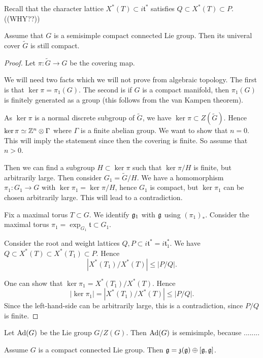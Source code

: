 \documentclass[11pt, english]{article}
\begin{document}
Recall that the character lattice $X^\ast (T) \subset i \mathfrak t^\ast$ satisfies $Q \subset X^\ast(T) \subset P$. ((WHY??))

\begin{prop}
 Assume that $G$ is a semisimple compact connected Lie group. Then its univeral cover $\widetilde G$ is still compact.
\end{prop}
\begin{proof}
Let $\pi: \widetilde G \to G$ be the covering map.

We will need two facts which we will not prove from algebraic topology. The first is that $\ker \pi = \pi_1(G)$. The second is if $G$ is a compact manifold, then $\pi_1(G)$ is finitely generated as a group (this follows from the van Kampen theorem). 

As $\ker \pi$ is a normal discrete subgroup of $\widetilde G$, we have $\ker \pi \subset Z(\widetilde G)$. Hence $\ker \pi \simeq \mathbb{Z}^n \otimes \Gamma$ where $\Gamma$ is a finite abelian group. We want to show that $n=0$. This will imply the statement since then the covering is finite. So assume that $n > 0$. 

Then we can find a subgroup $H \subset \ker \pi$ such that $\ker \pi / H$ is finite, but arbitrarily large. Then consider $G_1 = \widetilde G/H$. We have a homomorphism $\pi_1: G_1 \to G$ with $\ker \pi_1 = \ker \pi/H$, hence $G_1$ is compact, but $\ker \pi_1$ can be chosen arbitrarily large. This will lead to a contradiction.

Fix a maximal torus $T \subset G$. We identify $\mathfrak g_1$ with $\mathfrak g$ using $(\pi_1)_\ast$. Consider the maximal torus $\pi_1 = \exp_{G_1} \mathfrak t \subset G_1$. 

Consider the root and weight lattices $Q,P \subset i \mathfrak t^\ast= i \mathfrak t_1^\ast$. We have $Q \subset X^\ast(T) \subset X^\ast(T_1) \subset P$. Hence
$$
| X^\ast(T_1)/X^\ast(T) | \leq |P/Q|.
$$

One can show that $\ker \pi_1 = X^\ast(T_1) / X^\ast(T)$. Hence
$$
| \ker \pi_1 | = | X^\ast(T_1)/X^\ast(T) | \leq |P/Q|.
$$
Since the left-hand-side can be arbitrarily large, this is a contradiction, since $P/Q$ is finite.
\end{proof}

Let $\operatorname{Ad}(G)$ be the Lie group $G/Z(G)$. Then $\operatorname{Ad}(G)$ is semisimple, because ........

\begin{prop}
Assume $G$ is a compact connected Lie group. Then $\mathfrak g = \mathfrak z (\mathfrak g) \oplus [\mathfrak g,\mathfrak g]$.
\end{prop}
\end{document}
